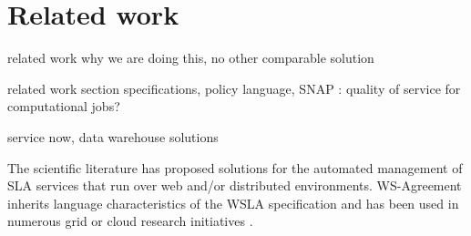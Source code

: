 \section{Related work}


related work why we are doing this, no other comparable solution

related work section
specifications, policy language, SNAP : quality of service for computational jobs? 

service now, data warehouse solutions

The scientific literature has proposed solutions for the automated management of SLA services that run over web \cite{wsla} and/or distributed \cite{SNAP, wsag} environments. WS-Agreement \cite{wsag} inherits language characteristics of the WSLA specification and has been used in numerous grid or cloud research initiatives \cite{soi, lessons, butler}.

